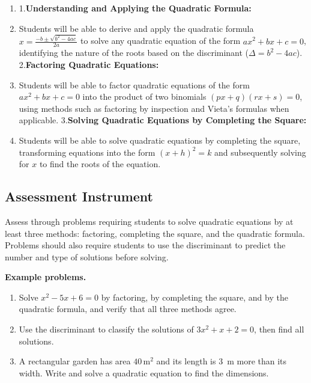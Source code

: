 \begin{enumerate}
    \item 1.\textbf{Understanding and Applying the Quadratic Formula:}
    \item Students will be able to derive and apply the quadratic formula $ x = \frac{-b \pm \sqrt{b^2 - 4ac}}{2a} $ to solve any quadratic equation of the form $ax^2 + bx + c = 0$, identifying the nature of the roots based on the discriminant ($\Delta = b^2 - 4ac$). 2.\textbf{Factoring Quadratic Equations:}
    \item Students will be able to factor quadratic equations of the form $ax^2 + bx + c = 0$ into the product of two binomials $(px + q)(rx + s) = 0$, using methods such as factoring by inspection and Vieta's formulas when applicable. 3.\textbf{Solving Quadratic Equations by Completing the Square:}
    \item Students will be able to solve quadratic equations by completing the square, transforming equations into the form $ (x + h)^2 = k $ and subsequently solving for $x$ to find the roots of the equation.
\end{enumerate}

\subsection{Assessment Instrument}
\label{ssec:asse-de40}

Assess through problems requiring students to solve quadratic equations by at least three
methods: factoring, completing the square, and the quadratic formula. Problems should also
require students to use the discriminant to predict the number and type of solutions
before solving.

\textbf{Example problems.}

\begin{enumerate}
    \item Solve $x^2 - 5x + 6 = 0$ by factoring, by completing the square, and by the quadratic formula, and verify that all three methods agree.
    \item Use the discriminant to classify the solutions of $3x^2 + x + 2 = 0$, then find all solutions.
    \item A rectangular garden has area $40\,\mathrm{m}^2$ and its length is 3~m more than its width. Write and solve a quadratic equation to find the dimensions.
\end{enumerate}

